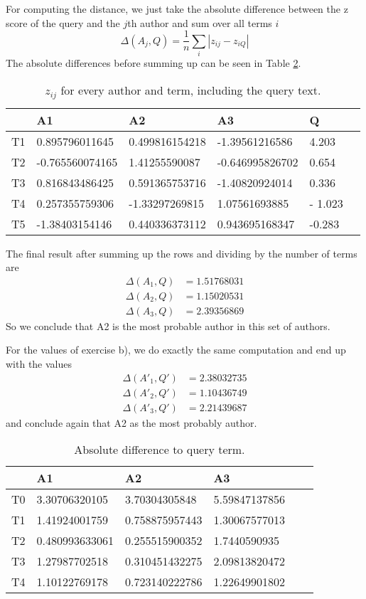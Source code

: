 \documentclass[11pt]{article}
\begin{document}
For computing the distance, we just take the
absolute difference between the z score of the query and the $j$th author and sum over all terms $i$
\begin{equation}
	\Delta(A_j, Q) = \frac{1}{n} \sum_i | z_{ij} - z_{iQ} |
\end{equation}
The absolute differences before summing up can be seen in Table \ref{table:abs_diff}.
\begin{table}[h]
\center
\begin{tabular}{|l|l|l|l|l|l|}
\hline
	 & A1 & A2 & A3 & Q \\
	 \hline
T1 & 0.895796011645 & 0.499816154218 & -1.39561216586 & 4.203 \\
 \hline 
T2 & -0.765560074165 & 1.41255590087 & -0.646995826702 & 0.654\\
 \hline 
T3 & 0.816843486425 & 0.591365753716 & -1.40820924014 & 0.336\\
 \hline 
T4 & 0.257355759306 & -1.33297269815 & 1.07561693885 & - 1.023\\
 \hline 
T5 & -1.38403154146 & 0.440336373112 & 0.943695168347 & -0.283 \\
\hline
\end{tabular}
\caption{$z_{ij}$ for every author and term, including the query text. }
\label{table:zscores}
\end{table}
The final result after summing up the rows
and dividing by the number
of terms are
\begin{align*}
	 \Delta(A_1, Q) &= 1.51768031 \\
	 \Delta(A_2, Q) &= 1.15020531 \\
	 \Delta(A_3, Q) &= 2.39356869
\end{align*}
So we conclude that A2 is the most probable author in this set of authors.

For the values of exercise b), we do exactly the same computation and end up with the values
\begin{align*}
	 \Delta(A'_1, Q') &= 2.38032735 \\
	 \Delta(A'_2, Q') &= 1.10436749 \\
	 \Delta(A'_3, Q') &= 2.21439687
\end{align*}
and conclude again that A2 as the most probably author.
\begin{table}
\center
\begin{tabular}{|l|l|l|l|l|l|}
\hline
	 & A1 & A2 & A3 \\
	 \hline
T0 & 3.30706320105 & 3.70304305848 & 5.59847137856 \\
 \hline 
T1 & 1.41924001759 & 0.758875957443 & 1.30067577013 \\
 \hline 	
T2 & 0.480993633061 & 0.255515900352 & 1.7440590935 \\
 \hline 
T3 & 1.27987702518 & 0.310451432275 & 2.09813820472 \\
 \hline 
T4 & 1.10122769178 & 0.723140222786 & 1.22649901802 \\
 \hline
\end{tabular}
\caption{Absolute difference to query term.}
\label{table:abs_diff}
\end{table}
\end{document}
